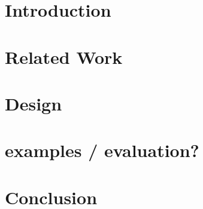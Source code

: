 \documentclass[conference]{IEEEtran}
\begin{document}
\begin{IEEEkeywords}

\end{IEEEkeywords}

\section{Introduction}



\section{Related Work}



\section{Design}



\section{examples / evaluation?}



\section{Conclusion}



%

\end{document}
